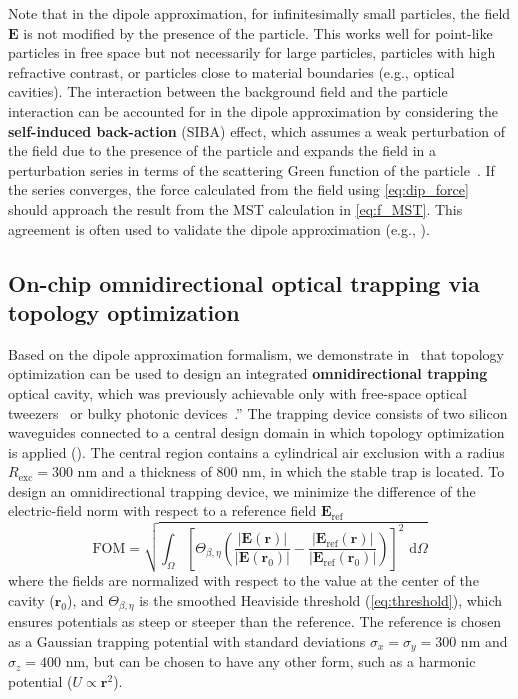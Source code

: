 Note that in the dipole approximation, for infinitesimally small particles, the field $\mathbf{E}$ is not modified by the presence of the particle.
This works well for point-like particles in free space but not necessarily 
for large particles, particles with high refractive contrast, or particles close to material
boundaries (e.g., optical cavities). The interaction between the background field and the particle interaction can be accounted for in the dipole
approximation by considering the \textbf{self-induced back-action} (SIBA) effect, which assumes a weak
perturbation of the field due to the presence of the particle and expands the field in a perturbation series in terms of 
the scattering Green function of the particle~\cite{novotny, SIBA, benjamin}. If the series converges, the force calculated from the field 
using \eqref{eq:dip_force} should approach the result from the MST calculation in \eqref{eq:f_MST}. 
This agreement is often used to validate the dipole approximation (e.g., \cite{ownpub1,ownpub3}).

\subsection*{On-chip omnidirectional optical trapping via topology optimization~\cite{ownpub1}}

Based on the dipole approximation formalism, we demonstrate in~\cite{ownpub1} that topology optimization can be used to design an integrated \textbf{omnidirectional trapping} optical cavity, which was previously achievable only with free-space optical tweezers~\cite{ashkin_acceleration_1970} or bulky photonic devices~\cite{manka_simulation_2024}.” The trapping device
consists of two silicon waveguides connected to a central design domain in which
topology optimization is applied (). The central region contains a cylindrical air exclusion with a radius
$R_\text{exc}=300$ nm and a thickness of $800$ nm, in which the stable trap is located.
To design an omnidirectional trapping device, we minimize  
the difference of the electric-field norm with respect to a reference field $\mathbf{E}_\text{ref}$
\begin{equation}
 \text{FOM} =\sqrt{\int_{\Omega}\left[\Theta_{\beta,\eta}\left(\frac{|\mathbf{E}(\mathbf{r})|}{\left|\mathbf{E}\left(\mathbf{r}_0\right)\right|}-\frac{\left|\mathbf{E}_{\text{ref}}(\mathbf{r})\right|}{\left|\mathbf{E}_{\text{ref}}\left(\mathbf{r}_0\right)\right|}\right)\right]^2 \text{~d} \Omega}
    \end{equation}
where the fields are normalized with respect to the value at the center of the cavity ($\mathbf{r}_0$), and $\Theta_{\beta,\eta}$ is the smoothed Heaviside threshold (\eqref{eq:threshold}), which ensures
potentials as steep or steeper than the reference. The reference is chosen as a Gaussian trapping potential with standard deviations $\sigma_x=\sigma_y=300$ nm and $\sigma_z=400$ nm, but can be chosen to have any other form, such as a harmonic potential ($U\propto\mathbf{r}^2$).

